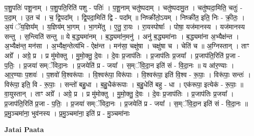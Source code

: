 \documentclass[17pt]{extarticle}
\begin{document}
प॒शु॒पतिः॑ पशू॒नाम् । प॒शु॒पति॒रिति॑ पशु - पतिः॑ । प॒शू॒नाम् चतु॑ष्पदाम् । चतु॑ष्पदामु॒त । चतु॑ष्पदा॒मिति॒ चतुः॑ - प॒दा॒म् । उ॒त च॑ । च॒ द्वि॒पदा᳚म् । द्वि॒पदा॒मिति॑ द्वि - पदा᳚म् ॥ निष्क्री॑तो॒ऽयम् । निष्क्री॑त॒ इति॒ निः - क्री॒तः॒ । अ॒यं ॅय॒ज्ञिय᳚म् । य॒ज्ञिय॑म् भा॒गम् । भा॒गमे॑तु । ए॒तु॒ रा॒यः । रा॒यस्पोषाः᳚ । पोषा॒ यज॑मानस्य । यज॑मानस्य सन्तु । स॒न्त्विति॑ सन्तु ॥ ये ब॒द्ध्यमा॑नम् । ब॒द्ध्यमा॑न॒मनु॑ । अनु॑ ब॒द्ध्यमा॑नाः । ब॒द्ध्यमा॑ना अ॒भ्यैक्ष॑न्त । अ॒भ्यैक्ष॑न्त॒ मन॑सा । अ॒भ्यैक्ष॒न्तेत्य॑भि - ऐक्ष॑न्त । मन॑सा॒ चक्षु॑षा । चक्षु॑षा च । चेति॑ च ॥ अ॒ग्निस्तान् । ताꣳ अग्रे᳚ । अग्रे॒ प्र । प्र मु॑मोक्तु । मु॒मो॒क्तु॒ दे॒वः । दे॒वः प्र॒जाप॑तिः । प्र॒जाप॑तिः प्र॒जया᳚ । प्र॒जाप॑ति॒रिति॑ प्र॒जा - प॒तिः॒ । प्र॒जया॑ सम्ॅविदा॒नः । प्र॒जयेति॑ प्र - जया᳚ । स॒म्ॅवि॒दा॒न इति॑ सं - वि॒दा॒नः ॥ य आ॑र॒ण्याः । आ॒र॒ण्याः प॒शवः॑ । प॒शवो॑ वि॒श्वरू॑पाः । वि॒श्वरू॑पा॒ विरू॑पाः । वि॒श्वरू॑पा॒ इति॑ वि॒श्व - रू॒पाः॒ । विरू॑पाः॒ सन्तः॑ । विरू॑पा॒ इति॒ वि - रू॒पाः॒ । सन्तो॑ बहु॒धा । ब॒हु॒धैक॑रूपाः । ब॒हु॒धेति॑ बहु - धा । एक॑रूपा॒ इत्येक॑ - रू॒पाः॒ ॥ वा॒युस्तान् । ताꣳ अग्रे᳚ । अग्रे॒ प्र । प्र मु॑मोक्तु । मु॒मो॒क्तु॒ दे॒वः । दे॒वः प्र॒जाप॑तिः । प्र॒जाप॑तिः प्र॒जया᳚ । प्र॒जाप॑ति॒रिति॑ प्र॒जा - प॒तिः॒ । प्र॒जया॑ सम्ॅविदा॒नः । प्र॒जयेति॑ प्र - जया᳚ । स॒म्ॅवि॒दा॒न इति॑ सं - वि॒दा॒नः ॥ प्र॒मु॒ञ्चमा॑ना॒ भुव॑नस्य । प्र॒मु॒ञ्चमा॑ना॒ इति॑ प्र - मु॒ञ्चमा॑नाः \newline

\textbf{Jatai Paata} \newline
\end{document}
